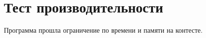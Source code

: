\section{Тест производительности}
Программа прошла ограничение по времени и памяти на контесте.

\pagebreak

